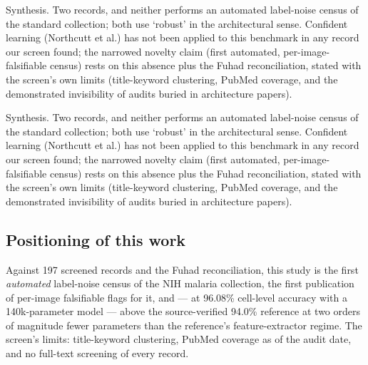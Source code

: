 Synthesis. Two records, and neither performs an automated label-noise census of the standard collection; both use `robust' in the architectural sense. Confident learning (Northcutt et al.) has not been applied to this benchmark in any record our screen found; the narrowed novelty claim (first automated, per-image-falsifiable census) rests on this absence plus the Fuhad reconciliation, stated with the screen's own limits (title-keyword clustering, PubMed coverage, and the demonstrated invisibility of audits buried in architecture papers).


Synthesis. Two records, and neither performs an automated label-noise census of the standard collection; both use `robust' in the architectural sense. Confident learning (Northcutt et al.) has not been applied to this benchmark in any record our screen found; the narrowed novelty claim (first automated, per-image-falsifiable census) rests on this absence plus the Fuhad reconciliation, stated with the screen's own limits (title-keyword clustering, PubMed coverage, and the demonstrated invisibility of audits buried in architecture papers).


\subsection*{Positioning of this work}
Against 197 screened records and the Fuhad reconciliation, this study is the first \emph{automated} label-noise census of the NIH malaria collection, the first publication of per-image falsifiable flags for it, and --- at 96.08\% cell-level accuracy with a 140k-parameter model --- above the source-verified 94.0\% reference at two orders of magnitude fewer parameters than the reference's feature-extractor regime. The screen's limits: title-keyword clustering, PubMed coverage as of the audit date, and no full-text screening of every record.

